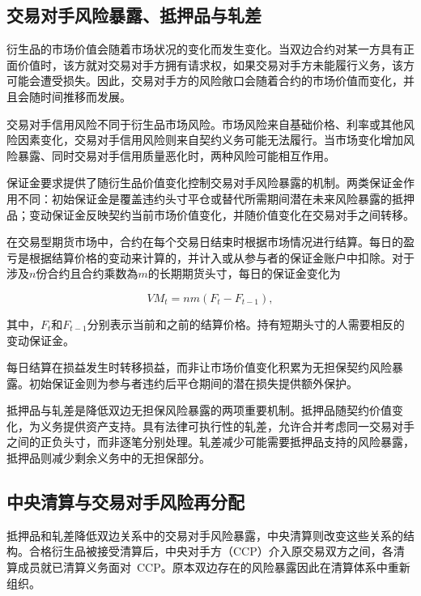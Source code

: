 \subsection{交易对手风险暴露、抵押品与轧差}

衍生品的市场价值会随着市场状况的变化而发生变化。当双边合约对某一方具有正面价值时，该方就对交易对手方拥有请求权，如果交易对手方未能履行义务，该方可能会遭受损失。因此，交易对手方的风险敞口会随着合约的市场价值而变化，并且会随时间推移而发展。

交易对手信用风险不同于衍生品市场风险。市场风险来自基础价格、利率或其他风险因素变化，交易对手信用风险则来自契约义务可能无法履行。当市场变化增加风险暴露、同时交易对手信用质量恶化时，两种风险可能相互作用。

保证金要求提供了随衍生品价值变化控制交易对手风险暴露的机制。两类保证金作用不同：初始保证金是覆盖违约头寸平仓或替代所需期间潜在未来风险暴露的抵押品；变动保证金反映契约当前市场价值变化，并随价值变化在交易对手之间转移。

在交易型期货市场中，合约在每个交易日结束时根据市场情况进行结算。每日的盈亏是根据结算价格的变动来计算的，并计入或从参与者的保证金账户中扣除。对于涉及$n$份合约且合约乘数為$m$的长期期货头寸，每日的保证金变化为

\begin{equation}
VM_t=nm(F_t-F_{t-1}),
\label{eq:ch11-daily-variation-margin}
\end{equation}

其中，$F_t$和$F_{t-1}$分别表示当前和之前的结算价格。持有短期头寸的人需要相反的变动保证金。

每日结算在损益发生时转移损益，而非让市场价值变化积累为无担保契约风险暴露。初始保证金则为参与者违约后平仓期间的潜在损失提供额外保护。

抵押品与轧差是降低双边无担保风险暴露的两项重要机制。抵押品随契约价值变化，为义务提供资产支持。具有法律可执行性的轧差，允许合并考虑同一交易对手之间的正负头寸，而非逐笔分别处理。轧差减少可能需要抵押品支持的风险暴露，抵押品则减少剩余义务中的无担保部分。

\subsection{中央清算与交易对手风险再分配}

抵押品和轧差降低双边关系中的交易对手风险暴露，中央清算则改变这些关系的结构。合格衍生品被接受清算后，中央对手方（CCP）介入原交易双方之间，各清算成员就已清算义务面对~CCP。原本双边存在的风险暴露因此在清算体系中重新组织。

